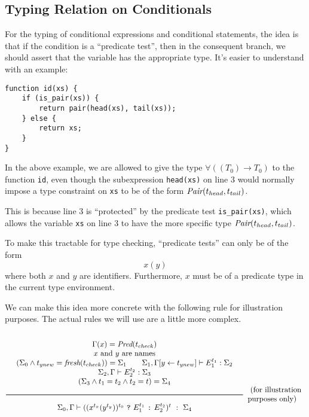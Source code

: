 \subsection{Typing Relation on Conditionals}

For the typing of conditional expressions and conditional statements,
the idea is that if the condition is a ``predicate test'',
then in the consequent branch, we should assert that the variable has the appropriate type.
It's easier to understand with an example:

\begin{lstlisting}
function id(xs) {
    if (is_pair(xs)) {
        return pair(head(xs), tail(xs));
    } else {
        return xs;
    }
}
\end{lstlisting}

In the above example,
we are allowed to give the type $\forall((T_0) \to T_0)$ to the function \texttt{id},
even though the subexpression \texttt{head(xs)} on line 3
would normally impose a type constraint on \texttt{xs}
to be of the form $\textit{Pair}(t_{head}, t_{tail})$.

This is because line 3 is ``protected'' by the predicate test \texttt{is\_pair(xs)},
which allows the variable \texttt{xs} on line 3
to have the more specific type $\textit{Pair}(t_{head}, t_{tail})$.

To make this tractable for type checking,
``predicate tests'' can only be of the form
\[ x(y) \]
where both $x$ and $y$ are identifiers.
Furthermore, $x$ must be of a predicate type in the current type environment.

We can make this idea more concrete with the following rule for illustration purposes.
The actual rules we will use are a little more complex.

\noindent
\[
  \Rule{
  \begin{array}{c}
  \Gamma(x) = \Pred(t_{check})
  \\
  x \text{ and } y \text{ are names}
  \\
  (\Sigma_0 \wedge t_{ynew} = \textit{fresh}(t_{check})) = \Sigma_1 \qquad
  \Sigma_1, \Gamma [ y \leftarrow t_{ynew} ] \vdash E_1^{t_1} : \Sigma_2
  \\
  \Sigma_2, \Gamma \vdash E_2^{t_2} : \Sigma_3
  \\
  (\Sigma_3 \wedge t_1 = t_2 \wedge t_2 = t) = \Sigma_{4}
  \end{array}
  }{
  \Sigma_0, \Gamma \vdash ( (x^{t_x}(y^{t_y}))^{t_0}\ \ThenOp\ E_1^{t_1}\ \ElseOp\ E_2^{t_2})^t\ :\ \Sigma_4}
  \begin{array}{l}
  \text{ (for illustration} \\
  \text{purposes only)}
  \end{array}
\]

